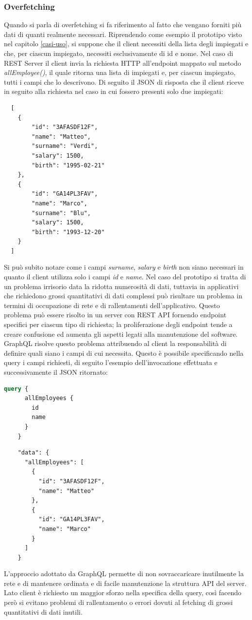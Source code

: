 \subsubsection*{Overfetching}
Quando si parla di overfetching si fa riferimento al fatto che vengano forniti più dati di quanti realmente necessari. Riprendendo come esempio il prototipo visto nel capitolo \ref{casi-uso}, si suppone che il client necessiti della lista degli impiegati e che, per ciascun impiegato, necessiti  esclusivamente di id e nome. Nel caso di REST Server il client invia la richiesta HTTP all'endpoint mappato sul metodo \textit{allEmployee()}, il quale ritorna una lista di impiegati e, per ciascun impiegato, tutti i campi che lo descrivono. Di seguito il JSON di risposta che il client riceve in seguito alla richiesta nel caso in cui fossero presenti solo due impiegati:
\begin{lstlisting}
  [
    {
        "id": "3AFASDF12F",
        "name": "Matteo",
        "surname": "Verdi",
        "salary": 1500,
        "birth": "1995-02-21"
    },
    {
        "id": "GA14PL3FAV",
        "name": "Marco",
        "surname": "Blu",
        "salary": 1500,
        "birth": "1993-12-20"
    }
  ]
\end{lstlisting}
Si può subito notare come i campi \textit{surname}, \textit{salary} e \textit{birth} non siano necessari in quanto il client utilizza solo i campi \textit{id} e \textit{name}. Nel caso del prototipo si tratta di un problema irrisorio data la ridotta numerosità di dati, tuttavia in applicativi che richiedono grossi quantitativi di dati complessi può risultare un problema in termini di occupazione di rete e di rallentamenti dell'applicativo. Questo problema può essere risolto in un server con REST API fornendo endpoint specifici per ciascun tipo di richiesta; la proliferazione degli endpoint tende a creare confusione ed aumenta gli aspetti legati alla manutenzione del software.\\
GraphQL risolve questo problema attribuendo al client la responsabilità di definire quali siano i campi di cui necessita. Questo è possibile specificando nella query i campi richiesti, di seguito l'esempio dell'invocazione effettuata e successivamente il JSON ritornato:
\begin{lstlisting}[language=GraphQL]
    query {
      allEmployees {
        id
        name
      }
    }
\end{lstlisting}
\begin{lstlisting}
    "data": {
      "allEmployees": [
        {
          "id": "3AFASDF12F",
          "name": "Matteo"
        },
        {
          "id": "GA14PL3FAV",
          "name": "Marco"
        }
      ]
    }
\end{lstlisting}
L'approccio adottato da GraphQL permette di non sovraccaricare inutilmente la rete e di mantenere ordinata e di facile manutenzione la struttura API del server. Lato client è richiesto un maggior sforzo nella specifica della query, così facendo però si evitano problemi di rallentamento o errori dovuti al fetching di grossi quantitativi di dati inutili.
